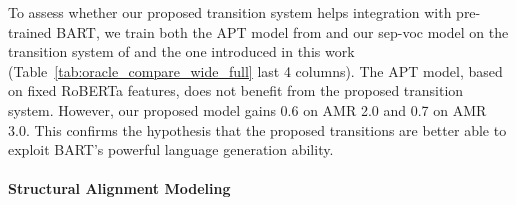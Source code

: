To assess whether our proposed transition system helps integration with pre-trained BART,
we train both the APT model from \citet{zhou2021amr} and our sep-voc model on the transition system of \citet{zhou2021amr} and the one introduced in this work (Table~\ref{tab:oracle_compare_wide_full} last 4 columns). The APT model, based on fixed RoBERTa features, does not benefit from the proposed transition system. However, our proposed model gains 0.6 on AMR 2.0 and 0.7 on AMR 3.0. This confirms the hypothesis that the proposed transitions are better able to exploit BART's powerful language generation ability.


\begin{table}[!t]
    \centering
     \caption{Ablation study of structure modeling with transition alignments.
    Results are on AMR 2.0 test data.}
    \label{tab:structure_ablation_compact}
\end{table}









\paragraph{Structural Alignment Modeling}


